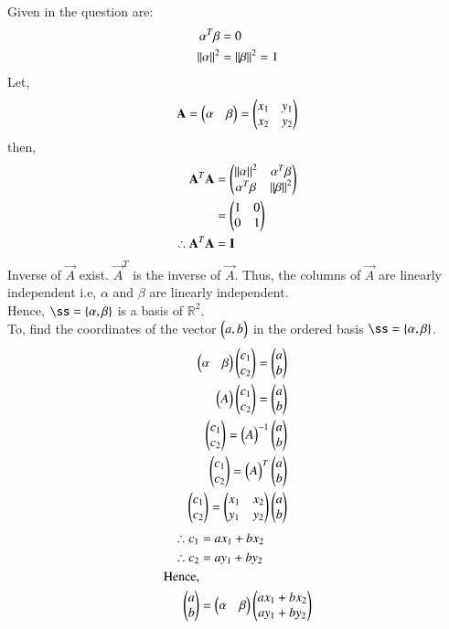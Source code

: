 \documentclass[journal,12pt,twocolumn]{IEEEtran}
\begin{document}
Given in the question are:
\begin{align}
\alpha^T\beta&=0\label{eq0}\\
\left\lVert\alpha\right\rVert^2 &=\left\lVert\beta\right\rVert^2=1 \label{eq1}
\end{align}
Let,
\begin{align}
 \mathbf{A}=\begin{pmatrix}\alpha & \beta\end{pmatrix}=\begin{pmatrix}x_1&y_1\\x_2&y_2\end{pmatrix}
\end{align}
then,
\begin{align}
 \mathbf{A}^T\mathbf{A}&=\begin{pmatrix}\left\lVert\alpha\right\rVert^2 &\alpha^T\beta\\\alpha^T\beta&\left\lVert\beta\right\rVert^2\end{pmatrix}\\ &=\begin{pmatrix}1&0\\0&1\end{pmatrix}\\
 \therefore \mathbf{A}^T\mathbf{A}&=\mathbf{I}
\end{align}
Inverse of $\vec{A}$ exist. $\vec{A}^T$ is the inverse of $\vec{A}$. 
Thus, the columns of $\vec{A}$ are linearly independent i.e, $\alpha$ and $\beta$ are linearly independent. \\
Hence, $\ss=\{\vec{\alpha},\vec{\beta}\}$ is a basis of $\mathbb{R}^2$.\\



To, find the coordinates of the vector $\begin{pmatrix}a,b\end{pmatrix}$ in the ordered basis $\ss=\{\vec{\alpha},\vec{\beta}\}$. 
   \begin{align}
   \begin{pmatrix}\alpha&\beta\end{pmatrix}\begin{pmatrix}c_1\\c_2\end{pmatrix}=\begin{pmatrix}a\\b\end{pmatrix}\\
\begin{pmatrix}A\end{pmatrix}\begin{pmatrix}c_1\\c_2\end{pmatrix}=\begin{pmatrix}a\\b\end{pmatrix}\\
\begin{pmatrix}c_1\\c_2\end{pmatrix}=\begin{pmatrix}A\end{pmatrix}^{-1}\begin{pmatrix}a\\b\end{pmatrix}\\
\begin{pmatrix}c_1\\c_2\end{pmatrix}=\begin{pmatrix}A\end{pmatrix}^T\begin{pmatrix}a\\b\end{pmatrix}\\
\begin{pmatrix}c_1\\c_2\end{pmatrix}=\begin{pmatrix}x_1&x_2\\y_1&y_2\end{pmatrix}\begin{pmatrix}a\\b\end{pmatrix}
\end{align}
\begin{align}
\therefore c_1&=ax_1+bx_2\\
\therefore c_2&=ay_1+by_2\\
\text{Hence,} \nonumber\\
 \begin{pmatrix}a\\b\end{pmatrix}&=\begin{pmatrix}\alpha&\beta\end{pmatrix}\begin{pmatrix}ax_1+bx_2\\ay_1+by_2\end{pmatrix}
\end{align}
 
\end{document}
